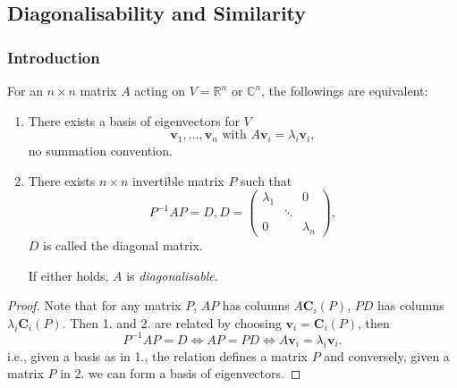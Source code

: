 \documentclass[a4paper]{article}
\begin{document}
    \subsection{Diagonalisability and Similarity}
    \subsubsection{Introduction}
    \begin{proposition}\label{prop:conditions for diag}
      For an $n\times n$ matrix $A$ acting on $V=\mathbb{R}^{n}$ or $
      \mathbb{C}^{n} $, the followings are equivalent:
      \begin{enumerate}
        \item There exists a basis of eigenvectors for $V$
          \[
            \mathbf{v}_1,\dots,\mathbf{v}_n \text{ with
            }A\mathbf{v}_i=\lambda_i\mathbf{v}_i
          ,\]
          no summation convention.
        \item There exists $n\times n$ invertible matrix $P$ such that
          \[
            P^{-1}AP=D, D=
            \begin{pmatrix}
              \lambda_1&&0\\
              &\ddots&\\
              0&&\lambda_n
            \end{pmatrix}
          ,\]
          $D$ is called the diagonal matrix.

          If either holds, $A$ is \textit{diagonalisable}.
      \end{enumerate}
    \end{proposition}
    \begin{proof}
      Note that for any matrix $P$, $AP$ has columns $
      A\mathbf{C}_i(P) $, $PD$ has columns $ \lambda_i
      \mathbf{C}_i(P) $. Then 1. and 2. are related by choosing $
      \mathbf{v}_i=\mathbf{C}_i(P) $, then
      \[
        P^{-1}AP=D \Longleftrightarrow AP=PD \Longleftrightarrow
        A\mathbf{v}_i=\lambda_i\mathbf{v}_i
      .\]
      i.e., given a basis as in 1., the relation defines a matrix $P$
      and conversely, given a matrix $P$ in 2. we can form a basis of
      eigenvectors.
    \end{proof}
\end{document}
